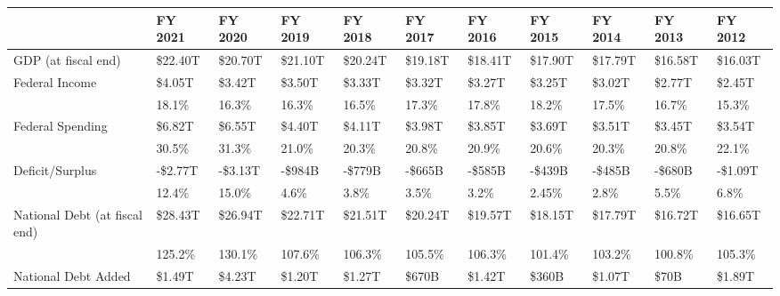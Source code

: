 \documentclass{article}
\begin{document}
    \begin{table}[H]
      \begin{tabular}{|l|l|l|l|l|l|l|l|l|l|l|}
      \hline
      & FY 2021 & FY 2020 & FY 2019 & FY 2018 & FY 2017 & FY 2016 & FY 2015 & FY 2014 & FY 2013 & FY 2012 \\ \hline
      GDP (at fiscal end) & \$22.40T & \$20.70T & \$21.10T & \$20.24T & \$19.18T & \$18.41T & \$17.90T & \$17.79T & \$16.58T & \$16.03T \\ \hline
      Federal Income & \$4.05T & \$3.42T & \$3.50T & \$3.33T & \$3.32T & \$3.27T & \$3.25T & \$3.02T & \$2.77T & \$2.45T \\
      & 18.1\% & 16.3\% & 16.3\% & 16.5\% & 17.3\% & 17.8\% & 18.2\% & 17.5\% & 16.7\% & 15.3\% \\ \hline
      Federal Spending & \$6.82T & \$6.55T & \$4.40T & \$4.11T & \$3.98T & \$3.85T & \$3.69T & \$3.51T & \$3.45T & \$3.54T \\
      & 30.5\% & 31.3\% & 21.0\% & 20.3\% & 20.8\% & 20.9\% & 20.6\% & 20.3\% & 20.8\% & 22.1\% \\ \hline
      Deficit/Surplus & -\$2.77T & -\$3.13T & -\$984B & -\$779B & -\$665B & -\$585B & -\$439B & -\$485B & -\$680B & -\$1.09T \\
      & 12.4\% & 15.0\% & 4.6\% & 3.8\% & 3.5\% & 3.2\% & 2.45\% & 2.8\% & 5.5\% & 6.8\% \\ \hline
      National Debt (at fiscal end) & \$28.43T & \$26.94T & \$22.71T & \$21.51T & \$20.24T & \$19.57T & \$18.15T & \$17.79T & \$16.72T & \$16.65T \\
      & 125.2\% & 130.1\% & 107.6\% & 106.3\% & 105.5\% & 106.3\% & 101.4\% & 103.2\% & 100.8\% & 105.3\% \\ \hline
      National Debt Added & \$1.49T & \$4.23T & \$1.20T & \$1.27T & \$670B & \$1.42T & \$360B & \$1.07T & \$70B & \$1.89T \\ \hline
      \end{tabular}
    \end{table}
\end{document}
